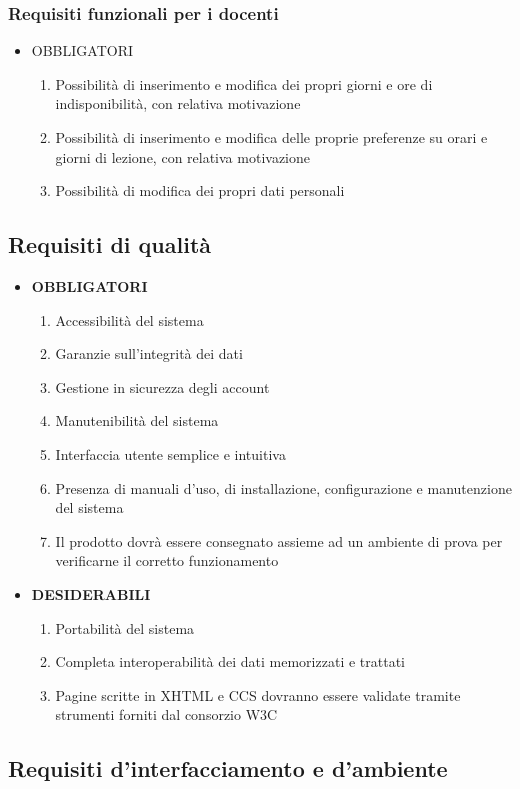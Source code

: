\documentclass[11pt,a4paper]{article}
\begin{document}
\subsubsection{Requisiti funzionali per i docenti}
\begin{itemize}
\item \textsc{OBBLIGATORI}
\begin{enumerate}
\item Possibilità di inserimento e modifica dei propri giorni e ore di indisponibilità, con relativa motivazione
\item Possibilità di inserimento e modifica delle proprie preferenze su orari e giorni di lezione, con relativa motivazione
\item Possibilità di modifica dei propri dati personali
\end{enumerate}
\end{itemize}
\subsection{Requisiti di qualità}
\begin{itemize}
\item \textbf{OBBLIGATORI}
\begin{enumerate}
\item Accessibilità del sistema
\item Garanzie sull'integrità dei dati
\item Gestione in sicurezza degli account
\item Manutenibilità del sistema
\item Interfaccia utente semplice e intuitiva
\item Presenza di manuali d'uso, di installazione, configurazione e manutenzione del sistema
\item Il prodotto dovrà essere consegnato assieme ad un ambiente di prova per verificarne il corretto funzionamento
\end{enumerate}
\item \textbf{DESIDERABILI}
\begin{enumerate}
\item Portabilità del sistema
\item Completa interoperabilità dei dati memorizzati e trattati
\item Pagine scritte in XHTML e CCS dovranno essere validate tramite strumenti forniti dal consorzio W3C
\end{enumerate}
\end{itemize}
\subsection{Requisiti d'interfacciamento e d'ambiente}
\end{document}
